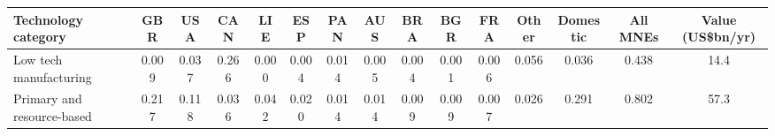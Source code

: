 \begin{tabular}{lcccccccccccccc}
\toprule
Technology category & GBR & USA & CAN & LIE & ESP & PAN & AUS & BRA & BGR & FRA & Other & Domestic & All MNEs & Value (US\$bn/yr) \\
\midrule
Low tech manufacturing & 0.009 & 0.037 & 0.266 & 0.000 & 0.004 & 0.014 & 0.005 & 0.004 & 0.001 & 0.006 & 0.056 & 0.036 & 0.438 & 14.4 \\
Primary and resource-based & 0.217 & 0.118 & 0.036 & 0.042 & 0.020 & 0.014 & 0.014 & 0.009 & 0.009 & 0.007 & 0.026 & 0.291 & 0.802 & 57.3 \\
\bottomrule
\end{tabular}
